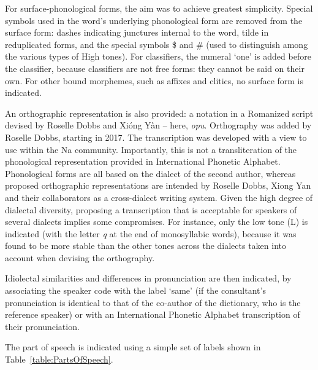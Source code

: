 For surface-phonological forms, the aim was to achieve greatest simplicity. Special symbols used in the word’s underlying phonological form are removed from the surface form: dashes indicating junctures internal to the word, tilde in reduplicated forms, and the special symbols \$ and \# (used to distinguish among the various types of High tones). For classifiers, the numeral ‘one’ is added before the classifier, because classifiers are not free forms: they cannot be said on their own. For other bound morphemes, such as affixes and clitics, no surface form is indicated.

An orthographic representation is also provided: a notation in a Romanized script devised by Roselle Dobbs and Xióng Yàn \parencite{dobbs_ortho_2018} -- here, \emph{opu}. Orthography was added by Roselle Dobbs, starting in 2017. The transcription was developed with a view to use within the Na community. Importantly, this is not a transliteration of the phonological representation provided in International Phonetic Alphabet. Phonological forms are all based on the dialect of the second author, whereas proposed orthographic representations are intended by Roselle Dobbs, Xiong Yan and their collaborators as a cross-dialect writing system. Given the high degree of dialectal diversity, proposing a transcription that is acceptable for speakers of several dialects implies some compromises. For instance, only the low tone (L) is indicated (with the letter \emph{q} at the end of monosyllabic words), because it was found to be more stable than the other tones across the dialects taken into account when devising the orthography.

Idiolectal similarities and differences in pronunciation are then indicated, by associating the speaker code with the label ‘same’ (if the consultant's pronunciation is identical to that of the co-author of the dictionary, who is the reference speaker) or with an International Phonetic Alphabet transcription of their pronunciation.

The part of speech is indicated using a simple set of labels shown in Table~\ref{table:PartsOfSpeech}.

